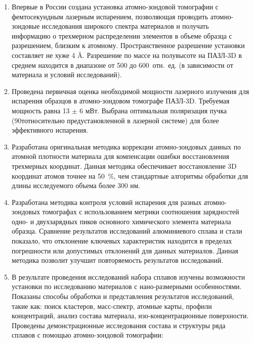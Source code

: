\begin{enumerate}[beginpenalty=10000]
	\item Впервые в России создана установка атомно-зондовой томографии с фемтосекундным лазерным испарением, позволяющая проводить атомно-зондовые исследования широкого спектра материалов  и получать информацию о трехмерном распределении элементов в объеме образца с разрешением, близким к атомному. Пространственное разрешение установки составляет не хуже 4 \r{A}. Разрешение по массе на полувысоте на ПАЗЛ-3D в среднем находится в диапазоне от 500 до 600~отн.~ед. (в зависимости от материала и условий исследований).
	\item Проведена первичная оценка необходимой мощности лазерного излучения для испарения образцов в атомно-зондовом томографе ПАЗЛ-3D. Требуемая мощность равна 13 $\pm$ 6 мВт. Выбрана оптимальная поляризация пучка (90\textdegree тотносительно предустановленной в лазерной системе) для более эффективного испарения.
	\item Разработана оригинальная методика коррекции атомно-зондовых данных по атомной плотности материала для компенсации ошибки восстановления трехмерных координат. Данная методика обеспечивает восстановление 3D координат атомов точнее на 50~\%, чем стандартные алгоритмы обработки для длины исследуемого объема более 300 нм.   
	\item Разработана методика контроля условий испарения для разных атомно-зондовых томографах с использованием метрики соотношения зарядностей одно- и двухзарядных пиков основного химического элемента материала образца. Сравнение результатов исследований алюминиевого сплава и стали показало, что отклонение ключевых характеристик находится в пределах погрешности или допустимых отклонений для данных материалов. Данная методика позволит улучшит повторяемость результатов исследований.	
	\item В результате проведения исследований набора сплавов изучены возможности установки по исследованию материалов с нано-размерными особенностями. Показаны способы обработки и представления результатов исследований, такие как: поиск кластеров, масс-спектр, атомные карты, профили концентраций, анализ состава материала, изо-концентрационные поверхности.  Проведены демонстрационные исследования состава и структуры ряда сплавов с помощью атомно-зондовой томографии:

\end{enumerate}
